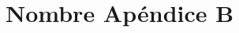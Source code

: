 \documentclass[11pt]{article}
\begin{document}
\clearpage
\newpage
{}
\def \nombreapendice{B}
\formatoapendice
\seteocontadores
\section{Nombre Apéndice B}\label{Apendice B}


\clearpage
\newpage
\end{document}
